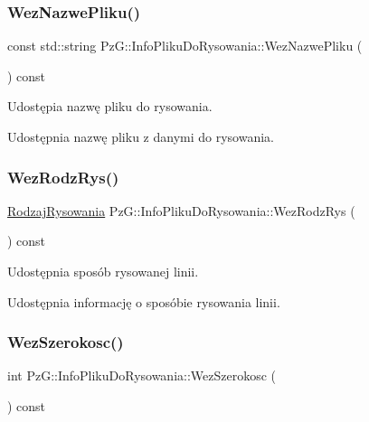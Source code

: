 \subsubsection{\texorpdfstring{Wez\+Nazwe\+Pliku()}{WezNazwePliku()}}
{\footnotesize\ttfamily const std\+::string Pz\+G\+::\+Info\+Pliku\+Do\+Rysowania\+::\+Wez\+Nazwe\+Pliku (\begin{DoxyParamCaption}{ }\end{DoxyParamCaption}) const\hspace{0.3cm}{\ttfamily [inline]}}



Udostępia nazwę pliku do rysowania. 

Udostępnia nazwę pliku z danymi do rysowania. \mbox{\label{classPzG_1_1InfoPlikuDoRysowania_a6a46f3c7b7a08dfa9d694f387f873234}} 
\subsubsection{\texorpdfstring{Wez\+Rodz\+Rys()}{WezRodzRys()}}
{\footnotesize\ttfamily \hyperlink{namespacePzG_a705c92106f39b7d0c34a6739d10ff0b6}{Rodzaj\+Rysowania} Pz\+G\+::\+Info\+Pliku\+Do\+Rysowania\+::\+Wez\+Rodz\+Rys (\begin{DoxyParamCaption}{ }\end{DoxyParamCaption}) const\hspace{0.3cm}{\ttfamily [inline]}}



Udostępnia sposób rysowanej linii. 

Udostępnia informację o sposóbie rysowania linii. \mbox{\label{classPzG_1_1InfoPlikuDoRysowania_a627bb615c50f3b03374774e6b974488b}} 
\subsubsection{\texorpdfstring{Wez\+Szerokosc()}{WezSzerokosc()}}
{\footnotesize\ttfamily int Pz\+G\+::\+Info\+Pliku\+Do\+Rysowania\+::\+Wez\+Szerokosc (\begin{DoxyParamCaption}{ }\end{DoxyParamCaption}) const\hspace{0.3cm}{\ttfamily [inline]}}



